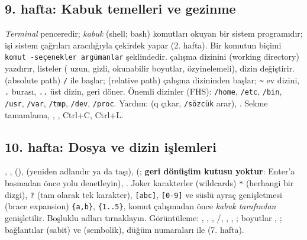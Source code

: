 \subsection{9. hafta: Kabuk temelleri ve gezinme}
\emph{Terminal} penceredir; \emph{kabuk} (shell; bash) komutları okuyan bir sistem programıdır; işi sistem çağrıları aracılığıyla çekirdek yapar (2. hafta). Bir komutun biçimi \texttt{komut -seçenekler argümanlar} şeklindedir.  çalışma dizinini (working directory) yazdırır,  listeler ( uzun,  gizli,  okunabilir boyutlar,  özyinelemeli),  dizin değiştirir.  (absolute path) \texttt{/} ile başlar;  (relative path) çalışma dizininden başlar; \texttt{\textasciitilde} ev dizini, \texttt{.} burası, \texttt{..} üst dizin,  geri döner. Önemli dizinler (FHS): \texttt{/home}, \texttt{/etc}, \texttt{/bin}, \texttt{/usr}, \texttt{/var}, \texttt{/tmp}, \texttt{/dev}, \texttt{/proc}. Yardım:  (q çıkar, \texttt{/sözcük} arar), . Sekme tamamlama, , \cmd{!!}, Ctrl+C, Ctrl+L.


\subsection{10. hafta: Dosya ve dizin işlemleri}
, ,  (),  (yeniden adlandır ya da taşı),  (; \textbf{geri dönüşüm kutusu yoktur}: Enter'a basmadan önce yolu denetleyin), . Joker karakterler (wildcards) \texttt{*} (herhangi bir dizgi), \texttt{?} (tam olarak tek karakter), \texttt{[abc]}, \texttt{[0-9]} ve süslü ayraç genişletmesi (brace expansion) \texttt{\{a,b\}}, \texttt{\{1..5\}}, komut çalışmadan önce \emph{kabuk tarafından} genişletilir. Boşluklu adları tırnaklayın. Görüntüleme: , , , /, , , ; boyutlar , ; bağlantılar  (sabit) ve  (sembolik), düğüm numaraları  ile (7. hafta).


